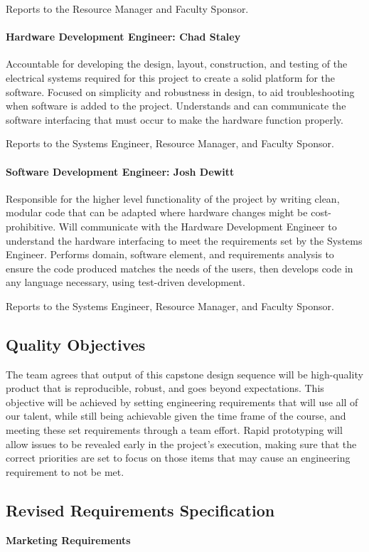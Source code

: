Reports to the Resource Manager and Faculty Sponsor.

\paragraph{Hardware Development Engineer: Chad Staley}
Accountable for developing the design, layout, construction, and testing of the electrical systems required for this project to create a solid platform for the software.
Focused on simplicity and robustness in design, to aid troubleshooting when software is added to the project.
Understands and can communicate the software interfacing that must occur to make the hardware function properly.

Reports to the Systems Engineer, Resource Manager, and Faculty Sponsor. 

\paragraph{Software Development Engineer: Josh Dewitt}
Responsible for the higher level functionality of the project by writing clean, modular code that can be adapted where hardware changes might be cost-prohibitive.
Will communicate with the Hardware Development Engineer to understand the hardware interfacing to meet the requirements set by the Systems Engineer.
Performs domain, software element, and requirements analysis to ensure the code produced matches the needs of the users, then develops code in any language necessary, using test­-driven development.

Reports to the Systems Engineer, Resource Manager, and Faculty Sponsor.

\subsection{Quality Objectives}
The team agrees that output of this capstone design sequence will be high-quality product that is reproducible, robust, and goes beyond expectations.
This objective will be achieved by setting engineering requirements that will use all of our talent, while still being achievable given the time frame of the course, and meeting these set requirements through a team effort.
Rapid prototyping will allow issues to be revealed early in the project's execution, making sure that the correct priorities are set to focus on those items that may cause an engineering requirement to not be met.

\subsection{Revised Requirements Specification}
\textbf{Marketing Requirements}

